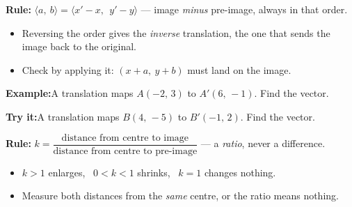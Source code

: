 \documentclass[12pt]{article}
\begin{document}


\begin{formulabox}
\textbf{Rule:} \quad
$\langle a,\ b \rangle = \langle x' - x,\ \ y' - y \rangle$ \quad --- image
\emph{minus} pre-image, always in that order.
\begin{itemize}[leftmargin=0.8cm, itemsep=1pt, topsep=2pt]
  \item Reversing the order gives the \emph{inverse} translation, the one that
        sends the image back to the original.
  \item Check by applying it: $(x + a,\ y + b)$ must land on the image.
\end{itemize}
\end{formulabox}

\begin{examplebox}
\textbf{Example:}\quad A translation maps $A(-2,\,3)$ to $A'(6,\,-1)$. Find the
vector.
\end{examplebox}

\begin{tryitbox}
\textbf{Try it:}\quad A translation maps $B(4,\,-5)$ to $B'(-1,\,2)$. Find the
vector.\\[2pt]
\end{tryitbox}


\begin{formulabox}
\textbf{Rule:} \quad
$k = \dfrac{\text{distance from centre to image}}{\text{distance from centre to
pre-image}}$ --- a \emph{ratio}, never a difference.
\begin{itemize}[leftmargin=0.8cm, itemsep=1pt, topsep=2pt]
  \item $k > 1$ enlarges, \ $0 < k < 1$ shrinks, \ $k = 1$ changes nothing.
  \item Measure both distances from the \emph{same} centre, or the ratio means
        nothing.
\end{itemize}
\end{formulabox}
\end{document}
